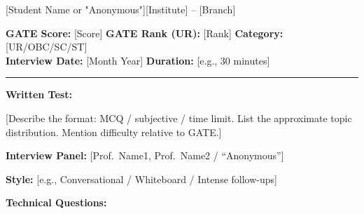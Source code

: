

\begin{experience}{[Student Name or "Anonymous"]}{[Institute] -- [Branch]}

  \textbf{GATE Score:} [Score] \quad
  \textbf{GATE Rank (UR):} [Rank] \quad
  \textbf{Category:} [UR/OBC/SC/ST] \\
  \textbf{Interview Date:} [Month Year] \quad
  \textbf{Duration:} [e.g., 30 minutes]

  \vspace{6pt}
  \hrule
  \vspace{6pt}

  \textbf{Written Test:}

  [Describe the format: MCQ / subjective / time limit.
   List the approximate topic distribution.
   Mention difficulty relative to GATE.]

  \vspace{6pt}

  \textbf{Interview Panel:} [Prof.\ Name1, Prof.\ Name2 / ``Anonymous'']

  \textbf{Style:} [e.g., Conversational / Whiteboard / Intense follow-ups]

  \vspace{6pt}

  \textbf{Technical Questions:}
  \begin{pfChecklist}
    \item [Q1]
    \item [Q2]
    \item [Q3]
    \item [Q4 -- add more as needed]
  \end{pfChecklist}


\end{experience}
